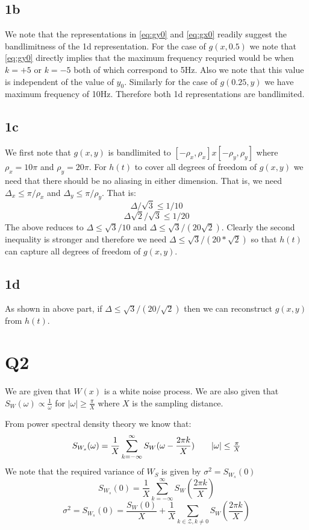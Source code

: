 \documentclass{article}
\begin{document}
\subsection*{1b}
We note that the representations in \ref{eq:gy0} and \ref{eq:gx0} readily suggest the bandlimitness of the 1d representation. For the case of $g(x, 0.5)$ we note that \ref{eq:gy0} directly implies that the maximum frequency requried would be when $k = +5$ or $k = -5$ both of which correspond to 5Hz. Also we note that this value is independent of the value of $y_0$. Similarly for the case of $g(0.25, y)$ we have maximum frequency of 10Hz. Therefore both 1d representations are bandlimited.

\subsection*{1c}
We first note that $g(x,y)$ is bandlimited to $[-\rho_x, \rho_x] x [-\rho_y, \rho_y]$ where $\rho_x = 10\pi$ and $\rho_y = 20 \pi$. For $h(t)$ to cover all degrees of freedom of $g(x, y)$ we need that there should be no aliasing in either dimension. That is, we need $\Delta_x \le \pi / \rho_x$ and $\Delta_y \le \pi / \rho_y$. That is:
$$\Delta / \sqrt{3} \le 1 /10$$
$$\Delta \sqrt{2} / \sqrt{3} \le 1 / 20$$
The above reduces to $\Delta \le \sqrt{3} / 10$ and $\Delta \le \sqrt{3}/(20 \sqrt{2})$. Clearly the second inequality is stronger and therefore we need $\Delta \le \sqrt{3} / (20 * \sqrt{2})$ so that $h(t)$ can capture all degrees of freedom of $g(x, y)$.

\subsection*{1d}
As shown in above part, if $\Delta \le \sqrt{3} / (20 / \sqrt{2})$ then we can reconstruct $g(x, y)$ from $h(t)$.

\section*{Q2}
We are given that $W(x)$ is a white noise process. We are also given that $S_W(\omega) \propto \frac{1}{\omega}$ for $|\omega| \ge \frac{\pi}{X}$ where $X$ is the sampling distance.

From power spectral density theory we know that:
\begin{align}
  \label{eq:psd1}
  S_{W_s}(\omega) = \frac{1}{X}\sum_{k=-\infty}^{\infty}S_W(\omega - \frac{2\pi k}{X}) \tag*{$|\omega| \le \frac{\pi}{X}$}
\end{align}
We note that the required variance of $W_S$ is given by $\sigma^2 = S_{W_s}(0)$
$$S_{W_s}(0) = \frac{1}{X} \sum_{k=-\infty}^{\infty}S_W(\frac{2\pi k}{X})$$
$$\sigma^2 = S_{W_s}(0) = \frac{S_W(0)}{X} + \frac{1}{X} \sum_{k \in \mathcal{Z}, k \ne 0} S_W(\frac{2 \pi k}{X})$$
\end{document}
